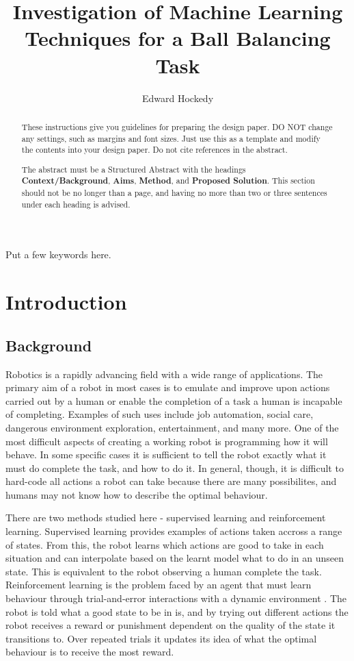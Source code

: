 \documentclass[12pt,a4paper]{article}
\title{Investigation of Machine Learning Techniques for a Ball Balancing Task}
\author{Edward Hockedy}
\date{}
\begin{document}
\maketitle

\begin{abstract}
These instructions give you guidelines for preparing the design paper.  DO NOT change any settings, such as margins and font sizes.  Just use this as a template and modify the contents into your design paper.  Do not cite references in the abstract.

The abstract must be a Structured Abstract with the headings {\bf Context/Background}, {\bf Aims}, {\bf Method}, and {\bf Proposed Solution}.  This section should not be no longer than a page, and having no more than two or three sentences under each heading is advised.
\end{abstract}

\begin{keywords}
Put a few keywords here.
\end{keywords}

\section{Introduction}
\subsection{Background}
Robotics is a rapidly advancing field with a wide range of applications. The primary aim of a robot in most cases is to emulate and improve upon actions carried out by a human or enable the completion of a task a human is incapable of completing. Examples of such uses include job automation, social care, dangerous environment exploration, entertainment, and many more. One of the most difficult aspects of creating a working robot is programming how it will behave. In some specific cases it is sufficient to tell the robot exactly what it must do complete the task, and how to do it. In general, though, it is difficult to hard-code all actions a robot can take because there are many possibilites, and humans may not know how to describe the optimal behaviour. 

There are two methods studied here - supervised learning and reinforcement learning. Supervised learning provides examples of actions taken accross a range of states. From this, the robot learns which actions are good to take in each situation and can interpolate based on the learnt model what to do in an unseen state. This is equivalent to the robot observing a human complete the task. Reinforcement learning is the problem faced by an agent that must learn behaviour through trial-and-error interactions with a dynamic environment \cite{rl_survey}. The robot is told what a good state to be in is, and by trying out different actions the robot receives a reward or punishment dependent on the quality of the state it transitions to. Over repeated trials it updates its idea of what the optimal behaviour is to receive the most reward.
\end{document}
